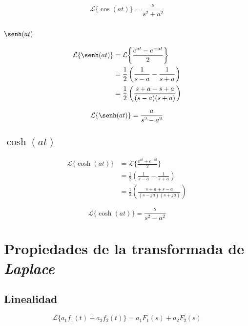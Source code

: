 \begin{equation}
    \mathcal{L}\{\cos(at)\}=\frac{s}{s^2+a^2}
\end{equation}

\subsection{$\senh(at)$}
\begin{equation*}
\begin{split}
    \mathcal{L}\{\senh(at)\}
        &=\mathcal{L}\biggl\{\frac{e^{at}-e^{-at}}{2}\biggl\}\\
        &=\frac{1}{2}\left(\frac{1}{s-a}-\frac{1}{s+a}\right)\\
        &=\frac{1}{2}\left(\frac{s+a-s+a}{(s-a)(s+a)}\right)
\end{split}
\end{equation*}

\begin{equation}
    \mathcal{L}\{\senh(at)\}=\frac{a}{s^2-a^2}
\end{equation}

\subsection{$\cosh(at)$}
\begin{equation*}
\begin{split}
    \mathcal{L}\{\cosh(at)\}
        &=\mathcal{L}\biggl\{\frac{e^{at}+e^{-at}}{2}\biggl\}\\
        &=\frac{1}{2}\left(\frac{1}{s-a}-\frac{1}{s+a}\right)\\
        &=\frac{1}{2}\left(\frac{s+a+s-a}{(s-ja)(s+ja)}\right)
\end{split}
\end{equation*}

\begin{equation}
    \mathcal{L}\{\cosh(at)\}=\frac{s}{s^2-a^2}
\end{equation}

\section{Propiedades de la transformada de \emph{Laplace}}

\subsection{Linealidad}
\begin{equation}
    \mathcal{L}\{a_1f_1(t)+a_2f_2(t)\}=a_1F_1(s)+a_2F_2(s)
\end{equation}

